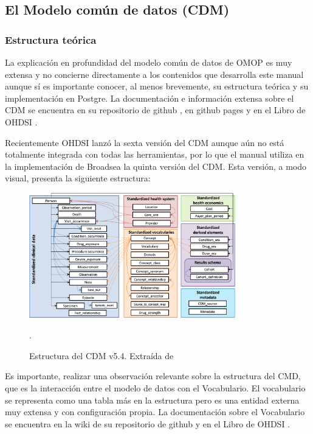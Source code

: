 \subsection{El Modelo común de datos (CDM)}

\subsubsection{Estructura teórica}

La explicación en profundidad del modelo común de datos de OMOP es muy extensa y no concierne directamente a los contenidos que desarrolla este manual aunque sí es importante conocer, al menos brevemente, su estructura teórica y su implementación en Postgre. La documentación e información extensa sobre el CDM se encuentra en su repositorio de github  \cite{githubCDM}, en github pages \cite{githubPagesCDM} y en el Libro de OHDSI \cite{TheBookOfOHDSI}.

Recientemente OHDSI lanzó la sexta versión del CDM aunque aún no está totalmente integrada con todas las herramientas, por lo que el manual utiliza en la implementación de Broadsea la quinta versión del CDM. Esta versión, a modo visual, presenta la siguiente estructura:

\begin{figure}[H]
    \centering
    \includegraphics[width=0.80\textwidth]{figures/CDMEstructura.png}
     \caption{Estructura del CDM v5.4. Extraída de \cite{githubPagesCDM}}.
    \label{fig:CDMEstructura}
\end{figure}

Es importante, realizar una observación relevante sobre la estructura del CMD, que es la interacción entre el modelo de datos con el Vocabulario. El vocabulario se representa como una tabla más en la estructura pero es una entidad externa muy extensa y con configuración propia. La documentación sobre el Vocabulario se encuentra en la wiki de su repositorio de github \cite{githubVocabwiki} y en el Libro de OHDSI \cite{TheBookOfOHDSI}.

